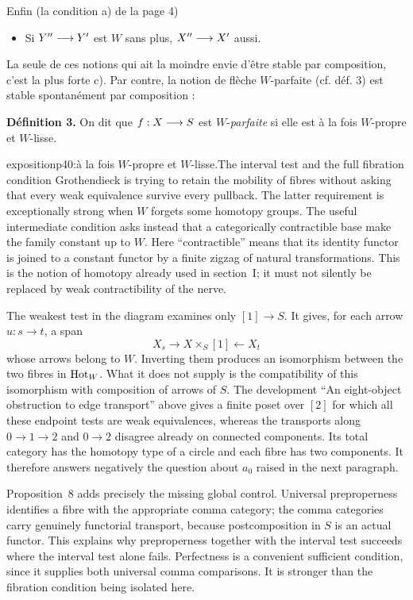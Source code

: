 Enfin (la condition a) de la page 4)

\begin{itemize}
\item[c)] Si $Y''\longrightarrow Y'$ est $W$ sans plus, $X''\longrightarrow X'$ aussi.
\end{itemize}

La seule de ces notions qui ait la moindre envie d'être stable par composition, c'est la plus forte c). Par contre, la notion de flèche $W$-parfaite (cf. déf. 3) est stable spontanément par composition :

\textbf{Définition 3.} On dit que $f : X\longrightarrow S$ est $W$-\textit{parfaite} si elle est à la fois $W$-propre et $W$-lisse.

\begin{dcomment}{exposition}{p40:à la fois $W$-propre et $W$-lisse.}{The interval test and the full fibration condition}
Grothendieck is trying to retain the mobility of fibres without asking that every weak equivalence survive every pullback. The latter requirement is exceptionally strong when $W$ forgets some homotopy groups. The useful intermediate condition asks instead that a categorically contractible base make the family constant up to $W$. Here ``contractible'' means that its identity functor is joined to a constant functor by a finite zigzag of natural transformations. This is the notion of homotopy already used in section~I; it must not silently be replaced by weak contractibility of the nerve.

The weakest test in the diagram examines only $[1]\to S$. It gives, for each arrow $u:s\to t$, a span
\[
 X_s\longrightarrow X\times_S[1]\longleftarrow X_t
\]
whose arrows belong to $W$. Inverting them produces an isomorphism between the two fibres in $\mathrm{Hot}_W$. What it does not supply is the compatibility of this isomorphism with composition of arrows of $S$. The development ``An eight-object obstruction to edge transport'' above gives a finite poset over $[2]$ for which all these endpoint tests are weak equivalences, whereas the transports along $0\to1\to2$ and $0\to2$ disagree already on connected components. Its total category has the homotopy type of a circle and each fibre has two components. It therefore answers negatively the question about $a_0$ raised in the next paragraph.

Proposition~8 adds precisely the missing global control. Universal preproperness identifies a fibre with the appropriate comma category; the comma categories carry genuinely functorial transport, because postcomposition in $S$ is an actual functor. This explains why preproperness together with the interval test succeeds where the interval test alone fails. Perfectness is a convenient sufficient condition, since it supplies both universal comma comparisons. It is stronger than the fibration condition being isolated here.
\end{dcomment}


